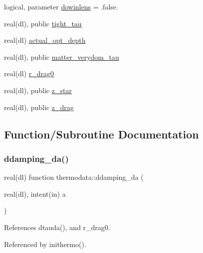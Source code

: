 \begin{DoxyCompactItemize}
logical, parameter \mbox{\hyperlink{namespacethermodata_a4f8d2aec0f4b6bcdc91d3d574bae3ba9}{dowinlens}} = .false.
\item 
real(dl), public \mbox{\hyperlink{namespacethermodata_acef8e1b2d18a8b07922432183d4673da}{tight\+\_\+tau}}
\item 
real(dl) \mbox{\hyperlink{namespacethermodata_a9d1b4188f1f98683027a29df3cbdd586}{actual\+\_\+opt\+\_\+depth}}
\item 
real(dl), public \mbox{\hyperlink{namespacethermodata_a13e012a8b804a7e2796df4f1afc4118e}{matter\+\_\+verydom\+\_\+tau}}
\item 
real(dl) \mbox{\hyperlink{namespacethermodata_a75e62e760e36ea9df5293d2f0141edff}{r\+\_\+drag0}}
\item 
real(dl), public \mbox{\hyperlink{namespacethermodata_ac0f90be6432813abe28335a041ffd10b}{z\+\_\+star}}
\item 
real(dl), public \mbox{\hyperlink{namespacethermodata_a74bf8ee4af304963a6fde19400dc5931}{z\+\_\+drag}}
\end{DoxyCompactItemize}


\subsection{Function/\+Subroutine Documentation}
\mbox{\label{namespacethermodata_a78b5c4ff5e2d2d472df5aae9bdd02d77}} 
\subsubsection{\texorpdfstring{ddamping\+\_\+da()}{ddamping\_da()}}
{\footnotesize\ttfamily real(dl) function thermodata\+::ddamping\+\_\+da (\begin{DoxyParamCaption}\item[{real(dl), intent(in)}]{a }\end{DoxyParamCaption})\hspace{0.3cm}{\ttfamily [private]}}



References dtauda(), and r\+\_\+drag0.



Referenced by inithermo().

